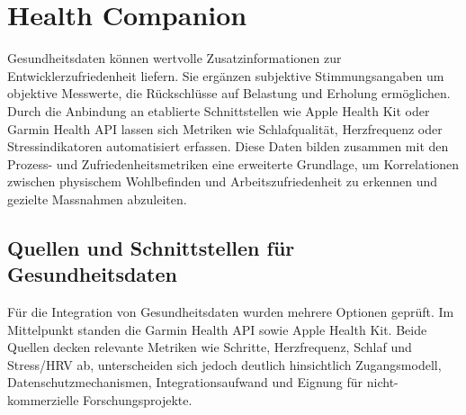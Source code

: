 \documentclass[12pt,a4paper]{report}
\begin{document}
\tableofcontents
\newpage


\section{Health Companion}

Gesundheitsdaten können wertvolle Zusatzinformationen zur Entwicklerzufriedenheit liefern. Sie ergänzen subjektive Stimmungsangaben
um objektive Messwerte, die Rückschlüsse auf Belastung und Erholung ermöglichen. Durch die Anbindung an etablierte Schnittstellen
wie Apple Health Kit oder Garmin Health API lassen sich Metriken wie Schlafqualität, Herzfrequenz oder Stressindikatoren
automatisiert erfassen. Diese Daten bilden zusammen mit den Prozess- und Zufriedenheitsmetriken eine erweiterte Grundlage, um
Korrelationen zwischen physischem Wohlbefinden und Arbeitszufriedenheit zu erkennen und gezielte Massnahmen abzuleiten.

\subsection{Quellen und Schnittstellen für Gesundheitsdaten}

Für die Integration von Gesundheitsdaten wurden mehrere Optionen geprüft. Im Mittelpunkt standen die Garmin Health API sowie Apple
Health Kit. Beide Quellen decken relevante Metriken wie Schritte, Herzfrequenz, Schlaf und Stress/HRV ab, unterscheiden sich jedoch
deutlich hinsichtlich Zugangsmodell, Datenschutzmechanismen, Integrationsaufwand und Eignung für nicht-kommerzielle
Forschungsprojekte.
\end{document}
